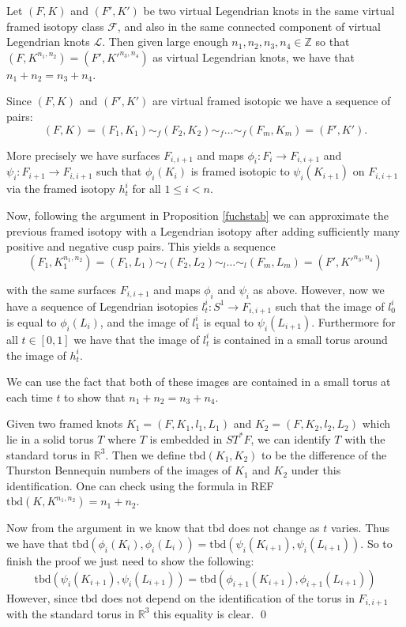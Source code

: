 \begin{thm}
Let $(F, K)$ and $(F', K')$ be two virtual Legendrian knots in the same virtual framed isotopy class $\mathcal{F}$, and also in the same connected component of virtual Legendrian knots $\mathcal{L}$. Then given large enough $n_1, n_2, n_3, n_4 \in \mathbb{Z}$ so that $(F, K^{n_1,n_2}) = (F',K'^{n_3, n_4})$ as virtual Legendrian knots, we have that $n_1+n_2 = n_3+n_4$.
\end{thm}

\pp
Since $(F,K)$ and $(F',K')$ are virtual framed isotopic we have a sequence of pairs:
$$(F, K) = (F_1,K_1) \sim_f (F_2, K_2) \sim_f \dots \sim_f (F_m, K_m) = (F', K').$$

More precisely we have surfaces $F_{i,i+1}$ and maps $\phi_i : F_i \rightarrow F_{i,i+1}$ and $\psi_i:F_{i+1}\rightarrow F_{i,i+1}$ such that $\phi_i(K_i)$ is framed isotopic to $\psi_i(K_{i+1})$ on $F_{i,i+1}$ via the framed isotopy $h_t^i$ for all $1\leq i < n$.  

Now, following the argument in Proposition \ref{fuchstab} we can approximate the previous framed isotopy with a Legendrian isotopy after adding sufficiently many positive and negative cusp pairs.  This yields a sequence
$$(F_1, K_1^{n_1,n_2}) = (F_1, L_1)\sim_l (F_2, L_2) \sim_l \dots \sim_l (F_m, L_m)=(F',K'^{n_3,n_4})$$

with the same surfaces $F_{i,i+1}$ and maps $\phi_i$ and $\psi_i$ as above. However, now we have a sequence of Legendrian isotopies $l_t^i:S^1\rightarrow F_{i,i+1}$ such that the image of $l_0^i$ is equal to $\phi_i(L_i)$,  and the image of $l_1^i $ is equal to $ \psi_i(L_{i+1})$.  Furthermore for all $t\in[0,1]$ we have that the image of $l_t^i$ is contained in a small torus around the image of $h_t^i$.

We can use the fact that both of these images are contained in a small torus  at each time $t$ to show that $n_1+n_2 = n_3+n_4$.

Given two framed knots $K_1=(F, K_1, l_1, L_1)$ and $K_2=(F,K_2,l_2,L_2)$ which lie in a solid torus $T$ where $T$ is embedded in $ST^*F$, we can identify $T$ with the standard torus in $\mathbb{R}^3$.  Then we define $\text{tbd}(K_1,K_2)$ to be the difference of the Thurston Bennequin numbers of the images of $K_1$ and $K_2$ under this identification.  One can check using the formula in REF $\text{tbd}(K,K^{n_1,n_2})=n_1+n_2$.

Now from the argument in \cite{Chernov} we know that $\text{tbd}$ does not change as $t$ varies.  Thus we have that $\text{tbd}(\phi_i(K_i), \phi_i(L_i)) = \text{tbd}(\psi_i(K_{i+1}), \psi_i(L_{i+1}))$.  So to finish the proof we just need to show the following: 
$$\text{tbd}(\psi_i(K_{i+1}), \psi_i(L_{i+1})) = \text{tbd}(\phi_{i+1}(K_{i+1}), \phi_{i+1}(L_{i+1}))$$
However, since $\text{tbd}$ does not depend on the identification of the torus in $F_{i,i+1}$ with the standard torus in $\mathbb{R}^3$ this equality is clear.
\qed


